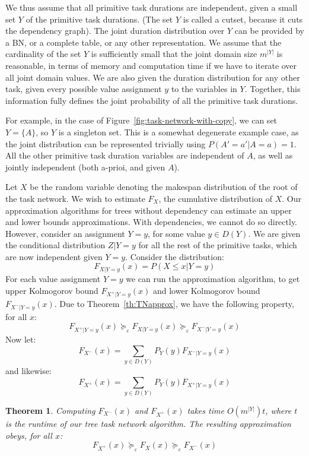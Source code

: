\documentclass[review]{elsarticle}
\newtheorem{theorem}{Theorem}
\begin{document}
We thus assume that all primitive task durations are independent, given
a small set $Y$ of the primitive task durations. (The set $Y$ is called a cutset, because it cuts the dependency graph). 
The joint duration distribution over $Y$
can be provided by a BN, or a complete table, or any other representation. We assume
that the cardinality of the set $Y$ is sufficiently small that the joint domain
size $m^{|Y|}$ is reasonable, in terms of memory
and computation time if we have to
iterate over all joint domain values. We are also given the duration distribution for any
other task, given every possible value assignment $y$ to the variables in $Y$.
Together, this information fully defines the joint probability of all the 
primitive task durations. 

For example, in the case of Figure~\ref{fig:task-network-with-copy}, we can set $Y=\{ A\}$, so $Y$ is a singleton set.
This is a somewhat degenerate example case, as
the joint distribution can be represented trivially using $P(A'=a'|A=a)=1$.
All the other primitive task duration variables are independent of $A$, as
well as jointly independent (both a-prioi, and given $A$).

Let $X$ be the random variable denoting the makespan distribution of the
root of the task network. We wish to estimate $F_X$, the cumulative distribution of $X$.
Our approximation algorithms for trees without dependency can estimate an
upper and lower bounds approximations. With dependencies, we cannot do so directly.
However, consider an assignment $Y=y$, for some value $y\in D(Y)$. We are given the conditional
distribution $Z|Y=y$ for all the rest of the primitive tasks, which are now
independent given $Y=y$. Consider the distribution:
\[
F_{X|Y=y}(x) = P(X\leq x| Y=y)
\]
For each value assignment $Y=y$ we can run the approximation algorithm, to get upper 
Kolmogorov bound $F_{X^+|Y=y}(x)$ and  lower Kolmogorov bound $F_{X^-|Y=y}(x)$. 
Due to Theorem~\ref{th:TNapprox}, we have
the following property, for all $x$:
\[
F_{X^+|Y=y}(x) \succeq_\varepsilon F_{X|Y=y}(x) \succeq_\varepsilon F_{X^-|Y=y}(x)
\]
Now let:
\[
F_{X^-}(x) = \sum_{y\in D(Y)} P_Y(y) F_{X^-|Y=y}(x)
\]
and likewise:
\[
F_{X^+}(x) = \sum_{y\in D(Y)} P_Y(y) F_{X^+|Y=y}(x)
\]

\begin{theorem}
Computing $F_{X^-}(x)$ and $F_{X^+}(x)$ takes time $O(m^{|Y|})t$, where $t$ is the runtime
of our tree task network algorithm. The resulting approximation obeys, for all $x$:
\[
F_{X^+}(x) \succeq_\varepsilon F_{X}(x) \succeq_\varepsilon F_{X^-}(x)
\]
\end{theorem}
\end{document}
